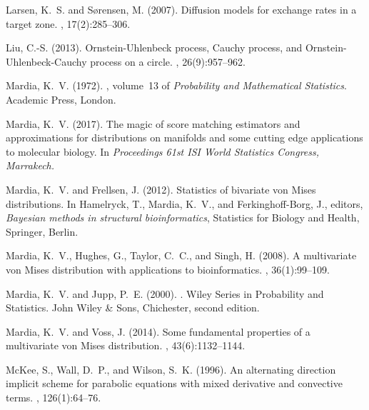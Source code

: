 \documentclass[oneside,11pt]{article}
\begin{document}
\begin{thebibliography}{}
	Larsen, K.~S. and S{\o}rensen, M. (2007).
	\newblock Diffusion models for exchange rates in a target zone.
	, 17(2):285--306.
	
	Liu, C.-S. (2013).
	\newblock Ornstein-{U}hlenbeck process, {C}auchy process, and
	{Ornstein-Uhlenbeck-Cauchy} process on a circle.
	, 26(9):957--962.
	
	Mardia, K.~V. (1972).
	, volume~13 of {\em Probability
		and Mathematical Statistics}.
	\newblock Academic Press, London.
	
	Mardia, K.~V. (2017).
	\newblock The magic of score matching estimators and approximations for
	distributions on manifolds and some cutting edge applications to molecular
	biology.
	\newblock In {\em Proceedings 61st ISI World Statistics Congress, Marrakech.}
	
	Mardia, K.~V. and Frellsen, J. (2012).
	\newblock Statistics of bivariate von {M}ises distributions.
	\newblock In Hamelryck, T., Mardia, K.~V., and Ferkinghoff-Borg, J., editors,
	{\em Bayesian methods in structural bioinformatics}, Statistics for Biology
	and Health, Springer, Berlin.
	
	Mardia, K.~V., Hughes, G., Taylor, C.~C., and Singh, H. (2008).
	\newblock A multivariate von {M}ises distribution with applications to
	bioinformatics.
	, 36(1):99--109.
	
	Mardia, K.~V. and Jupp, P.~E. (2000).
	.
	\newblock Wiley Series in Probability and Statistics. John Wiley \& Sons,
	Chichester, second edition.
	
	Mardia, K.~V. and Voss, J. (2014).
	\newblock Some fundamental properties of a multivariate von {M}ises
	distribution.
	, 43(6):1132--1144.
	
	McKee, S., Wall, D.~P., and Wilson, S.~K. (1996).
	\newblock An alternating direction implicit scheme for parabolic equations with
	mixed derivative and convective terms.
	, 126(1):64--76.
	

\end{thebibliography}
\end{document}
